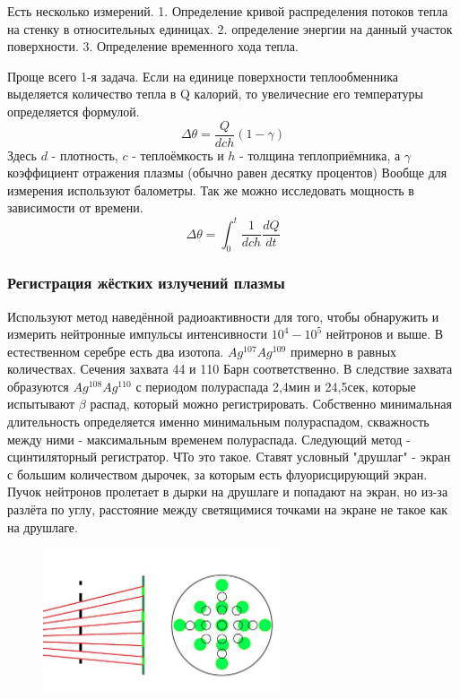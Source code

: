 \documentclass[10pt, a4paper]{article}
\begin{document}
Есть несколько измерений.
1. Определение кривой распределения потоков тепла на стенку в относительных единицах.
2. определение энергии на данный участок поверхности.
3. Определение временного хода тепла.


Проще всего 1-я задача. Если на единице поверхности теплообменника выделяется количество тепла в Q калорий, то увеличесние его температуры определяется формулой.
 \begin{equation}
	\Delta \theta= \frac{Q}{dch} (1-\gamma)
\end{equation}
Здесь $d$ - плотность, $c$ - теплоёмкость и $h$ - толщина теплоприёмника, а $\gamma$ коэффициент отражения плазмы (обычно равен десятку процентов)
Вообще для измерения используют балометры. Так же можно исследовать мощность в зависимости от времени.
 \begin{equation}
	\Delta \theta= \int_{0}^{t} \frac{1}{dch} \frac{dQ}{dt}
\end{equation}

\subsubsection{Регистрация жёстких излучений плазмы}

Используют метод наведённой радиоактивности для того, чтобы обнаружить и измерить нейтронные импульсы интенсивности $10^4 - 10^5$ нейтронов и выше.
В естественном серебре есть два изотопа. $Ag^{107} Ag^{109}$ примерно в равных количествах. Сечения захвата 44 и 110 Барн соответственно. В следствие захвата образуются  $Ag^{108} Ag^{110}$ с периодом полураспада 2,4мин и 24,5сек, которые испытывают $\beta$ распад, который можно регистрировать. Собственно минимальная длительность определяется именно минимальным полураспадом, скважность между ними - максимальным временем полураспада.
Следующий метод - сцинтиляторный регистратор. ЧТо это такое. Ставят условный "друшлаг" - экран с большим количеством дырочек, за которым есть флуорисцирующий экран. Пучок нейтронов пролетает в дырки на друшлаге и попадают на экран, но из-за разлёта по углу, расстояние между светящимися точками на экране не такое как на друшлаге.

\begin{figure}[h!]
	\begin{center}
		\includegraphics[width=70mm]{scintelator.JPG}
	\end{center}
\end{figure}
\end{document}
